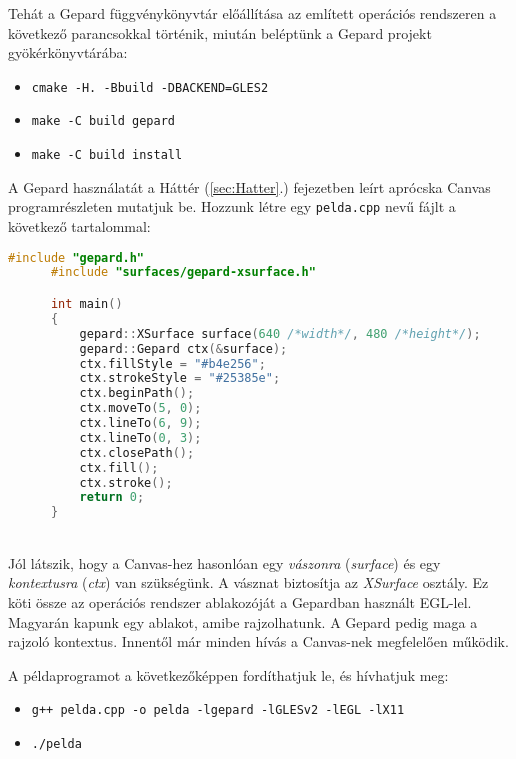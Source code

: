 \documentclass[12pt]{report}
\theoremstyle{definition}
\newcommand{\func}[1]{{\textsl{#1}}}
\begin{document}
Tehát a Gepard függvénykönyvtár előállítása az említett operációs rendszeren a
következő parancsokkal történik, miután beléptünk a Gepard projekt
gyökérkönyvtárába:
  {\small
    \begin{itemize} \renewcommand\labelitemi{\texttt{\$}}
      \item \texttt{cmake -H. -Bbuild -DBACKEND=GLES2}
      \item \texttt{make -C build gepard}
      \item \texttt{make -C build install}
    \end{itemize}
  }

A Gepard használatát a Háttér (\ref{sec:Hatter}.) fejezetben leírt aprócska
Canvas programrészleten mutatjuk be. Hozzunk létre egy
{\small\texttt{pelda.cpp}} nevű fájlt a következő tartalommal:

    \begin{lstlisting}[language=C++, autogobble=true]
      #include "gepard.h"
      #include "surfaces/gepard-xsurface.h"

      int main()
      {
          gepard::XSurface surface(640 /*width*/, 480 /*height*/);
          gepard::Gepard ctx(&surface);
          ctx.fillStyle = "#b4e256";
          ctx.strokeStyle = "#25385e";
          ctx.beginPath();
          ctx.moveTo(5, 0);
          ctx.lineTo(6, 9);
          ctx.lineTo(0, 3);
          ctx.closePath();
          ctx.fill();
          ctx.stroke();
          return 0;
      }
    \end{lstlisting}
  \endminipage
\\

Jól látszik, hogy a Canvas-hez hasonlóan egy \emph{vászonra} (\func{surface})
és egy \emph{kontextusra} (\func{ctx}) van szükségünk. A vásznat biztosítja az
\func{XSurface} osztály. Ez köti össze az operációs rendszer ablakozóját a
Gepardban használt EGL-lel. Magyarán kapunk egy ablakot, amibe rajzolhatunk. A
Gepard pedig maga a rajzoló kontextus. Innentől már minden hívás a Canvas-nek
megfelelően működik.

A példaprogramot a következőképpen fordíthatjuk le, és hívhatjuk meg:
  {\small
    \begin{itemize} \renewcommand\labelitemi{\texttt{\$}}
      \item \texttt{g++ pelda.cpp -o pelda -lgepard -lGLESv2 -lEGL -lX11}
      \item \texttt{./pelda}
    \end{itemize}
  }
\end{document}
